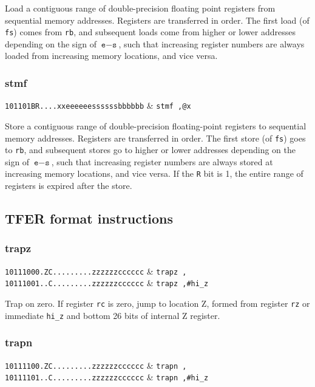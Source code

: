 Load a contiguous range of double-precision floating point registers from sequential memory addresses. Registers are transferred in order. The first load (of \texttt{fs}) comes from \texttt{rb}, and subsequent loads come from higher or lower addresses depending on the sign of $\texttt{e}-\texttt{s}$, such that increasing register numbers are always loaded from increasing memory locations, and vice versa.

\subsubsection{stmf}

\decfmt
\texttt{101101BR....xxeeeeeessssssbbbbbb} & \texttt{stmf ,@x}
\finfmt

Store a contiguous range of double-precision floating-point registers to sequential memory addresses. Registers are transferred in order. The first store (of \texttt{fs}) goes to \texttt{rb}, and subsequent stores go to higher or lower addresses depending on the sign of $\texttt{e}-\texttt{s}$, such that increasing register numbers are always stored at increasing memory locations, and vice versa. If the \texttt{R} bit is 1, the entire range of registers is expired after the store.

\subsection{TFER format instructions}

\subsubsection{trapz}

\decfmt
\texttt{10111000.ZC.........zzzzzzcccccc} & \texttt{trapz ,} \\
\texttt{10111001..C.........zzzzzzcccccc} & \texttt{trapz ,\#hi\_z} \\
\finfmt

Trap on zero. If register \texttt{rc} is zero, jump to location Z, formed from register \texttt{rz} or immediate \texttt{hi\_z} and bottom 26 bits of internal Z register.

\subsubsection{trapn}

\decfmt
\texttt{10111100.ZC.........zzzzzzcccccc} & \texttt{trapn ,} \\
\texttt{10111101..C.........zzzzzzcccccc} & \texttt{trapn ,\#hi\_z} \\
\finfmt

